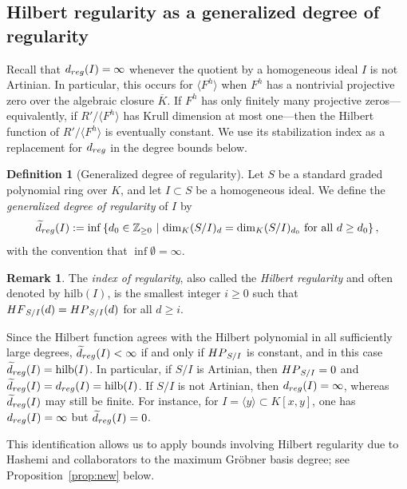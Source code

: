 \documentclass{article}
\theoremstyle{definition}
\newtheorem{definition}[theorem]{Definition}
\newtheorem{remark}[theorem]{Remark}
\theoremstyle{plain}
\theoremstyle{plain}
\theoremstyle{plain}
\theoremstyle{plain}
\numberwithin{equation}{subsection}
\begin{document}
\subsection{Hilbert regularity as a generalized degree of regularity}\label{subsec:ext}

Recall that $d_{\rm reg}(I)=\infty$ whenever the quotient by a homogeneous ideal $I$ is not Artinian.
In particular, this occurs for $\langle F^h\rangle$ when $F^h$ has a nontrivial projective zero over the algebraic closure $\overline K$.
If $F^h$ has only finitely many projective zeros---equivalently, if $R'/\langle F^h\rangle$ has Krull dimension at most one---then the Hilbert function of $R'/\langle F^h\rangle$ is eventually constant.
We use its stabilization index as a replacement for $d_{\rm reg}$ in the degree bounds below.

\begin{definition}[Generalized degree of regularity]\label{def:new}
Let $S$ be a standard graded polynomial ring over $K$, and let $I\subset S$ be a homogeneous ideal.
We define the \emph{generalized degree of regularity} of $I$ by
\[
\widetilde d_{\rm reg}(I)
:= \inf\left\{ d_0\in\mathbb Z_{\geq0} \ \middle|\ \dim_K(S/I)_d=\dim_K(S/I)_{d_0}
\text{ for all }d\geq d_0\right\},
\]
with the convention that $\inf\emptyset=\infty$.
\end{definition}

\begin{remark}\label{rem:hilbreg}
The \emph{index of regularity}, also called the \emph{Hilbert regularity} and often denoted by $\mathrm{hilb}(I)$, is the smallest integer $i\geq0$ such that ${\rm HF}_{S/I}(d)={\rm HP}_{S/I}(d)$ for all $d\geq i$.

Since the Hilbert function agrees with the Hilbert polynomial in all sufficiently large degrees, $\widetilde d_{\rm reg}(I)<\infty$ if and only if ${\rm HP}_{S/I}$ is constant, and in this case $\widetilde d_{\rm reg}(I)=\mathrm{hilb}(I)$.
In particular, if $S/I$ is Artinian, then ${\rm HP}_{S/I}=0$ and $\widetilde d_{\rm reg}(I)=d_{\rm reg}(I)=\mathrm{hilb}(I)$.
If $S/I$ is not Artinian, then $d_{\rm reg}(I)=\infty$, whereas $\widetilde d_{\rm reg}(I)$ may still be finite.
For instance, for $I=\langle y\rangle\subset K[x,y]$, one has $d_{\rm reg}(I)=\infty$ but $\widetilde d_{\rm reg}(I)=0$.

This identification allows us to apply bounds involving Hilbert regularity due to Hashemi and collaborators to the maximum Gr\"obner basis degree; see Proposition~\ref{prop:new} below.
\end{remark}
\end{document}
